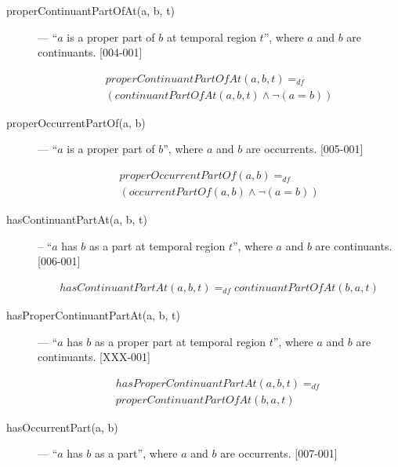 \documentclass{article}
\newcommand{\DF}{\ensuremath{=_{df}}}
\begin{document}
\begin{description}

\item[properContinuantPartOfAt(a, b, t)] --- ``$a$ is a proper part of $b$ at temporal region $t$'', where $a$ and $b$ are continuants. [004-001]

\begin{equation}
\begin{split}
properContinuantPartOfAt(a, b, t) \DF \\
(continuantPartOfAt(a, b, t) \wedge {\neg}(a = b))
\end{split}
\end{equation}

\item[properOccurrentPartOf(a, b)] --- ``$a$ is a proper part of $b$'', where $a$ and $b$ are occurrents. [005-001]

\begin{equation}
\begin{split}
properOccurrentPartOf(a, b) \DF \\
(occurrentPartOf(a, b) \wedge {\neg}(a = b))
\end{split}
\end{equation}

\item[hasContinuantPartAt(a, b, t)] -- ``$a$ has $b$ as a part at temporal region $t$'', where $a$ and $b$ are continuants. [006-001]

\begin{equation}
\begin{split}
hasContinuantPartAt(a, b, t) \DF continuantPartOfAt(b, a, t)
\end{split}
\end{equation}

\item[hasProperContinuantPartAt(a, b, t)] --- ``$a$ has $b$ as a proper part at temporal region $t$'', where $a$ and $b$ are continuants. [XXX-001]

\begin{equation}
\begin{split}
hasProperContinuantPartAt(a, b, t) \DF \\
properContinuantPartOfAt(b, a, t)
\end{split}
\end{equation}

\item[hasOccurrentPart(a, b)] --- ``$a$ has $b$ as a part'', where $a$ and $b$ are occurrents. [007-001]


\end{description}
\end{document}
